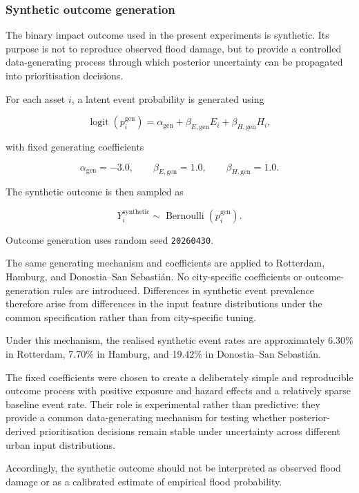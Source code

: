\documentclass[
]{article}
\begin{document}
\subsubsection{Synthetic outcome
generation}\label{synthetic-outcome-generation}

The binary impact outcome used in the present experiments is synthetic.
Its purpose is not to reproduce observed flood damage, but to provide a
controlled data-generating process through which posterior uncertainty
can be propagated into prioritisation decisions.

For each asset \(i\), a latent event probability is generated using

\[
\operatorname{logit}(p_i^{\mathrm{gen}})
=
\alpha_{\mathrm{gen}}
+
\beta_{E,\mathrm{gen}} E_i
+
\beta_{H,\mathrm{gen}} H_i,
\]

with fixed generating coefficients

\[
\alpha_{\mathrm{gen}}=-3.0,
\qquad
\beta_{E,\mathrm{gen}}=1.0,
\qquad
\beta_{H,\mathrm{gen}}=1.0.
\]

The synthetic outcome is then sampled as

\[
Y_i^{\mathrm{synthetic}}
\sim
\operatorname{Bernoulli}
\left(
p_i^{\mathrm{gen}}
\right).
\]

Outcome generation uses random seed \texttt{20260430}.

The same generating mechanism and coefficients are applied to Rotterdam,
Hamburg, and Donostia--San Sebastián. No city-specific coefficients or
outcome-generation rules are introduced. Differences in synthetic event
prevalence therefore arise from differences in the input feature
distributions under the common specification rather than from
city-specific tuning.

Under this mechanism, the realised synthetic event rates are
approximately 6.30\% in Rotterdam, 7.70\% in Hamburg, and 19.42\% in
Donostia--San Sebastián.

The fixed coefficients were chosen to create a deliberately simple and
reproducible outcome process with positive exposure and hazard effects
and a relatively sparse baseline event rate. Their role is experimental
rather than predictive: they provide a common data-generating mechanism
for testing whether posterior-derived prioritisation decisions remain
stable under uncertainty across different urban input distributions.

Accordingly, the synthetic outcome should not be interpreted as observed
flood damage or as a calibrated estimate of empirical flood probability.
\end{document}
